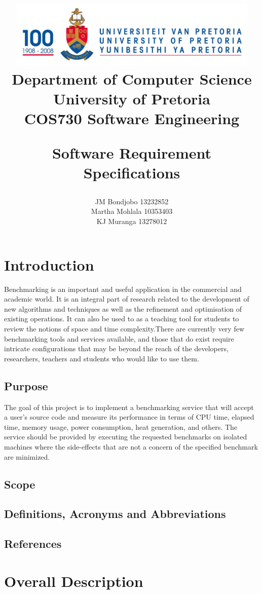 \documentclass[a4paper,12pt]{article}
\title{\includegraphics[width=12cm]{Eeufeeslogo.jpg} \\
       Department of Computer Science \\
       University of Pretoria \\
       \vspace{0.5cm}
       COS730 Software Engineering \\
       \vspace{0.5cm}
       \begin{large} \textbf{Software Requirement Specifications}\end{large}}
\date{}
\author{	JM Bondjobo		13232852 		\\
		Martha Mohlala		10353403
		 \\
		 KJ Muranga         13278012        \\
}
\begin{document}
\maketitle
\thispagestyle{empty}
\clearpage

\newpage
{}
\thispagestyle{empty}
\tableofcontents
\clearpage

\newpage
{}

\section {Introduction}
Benchmarking is an important and useful application in the commercial and academic world. It is an integral part of research related to the development of new algorithms and techniques as well as the refinement and optimisation of existing operations. It can also be used to as a teaching tool for students to review the notions of space and time complexity.There are currently very few benchmarking tools and services available, and those that do exist require intricate configurations that may be beyond the reach of the developers, researchers, teachers and students who would like to use them.
\subsection{Purpose}
The goal of this project is to implement a benchmarking service that will accept a user's source code and measure its performance in terms of CPU time, elapsed time, memory usage, power consumption, heat generation, and others. The service should be provided by executing the requested benchmarks on isolated machines where the side-effects that are not a concern of the specified benchmark are minimized.
\subsection{Scope}

\subsection{Definitions, Acronyms and Abbreviations}

\subsection{References}

\section{Overall Description}
\end{document}

